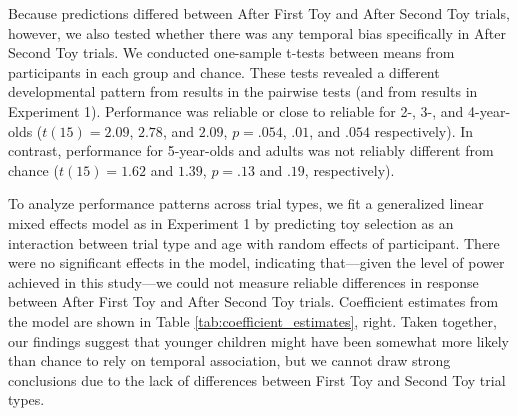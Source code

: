 \documentclass[man]{apa2}
\begin{document}


Because predictions differed between After First Toy and After Second Toy trials, however, we also tested whether there was any temporal bias specifically in After Second Toy trials. We conducted one-sample t-tests between means from participants in each group and chance. These tests revealed a different developmental pattern from results in the pairwise tests (and from results in Experiment 1). Performance was reliable or close to reliable for 2-, 3-, and 4-year-olds ($t(15) = 2.09$, $2.78$, and $2.09$, $p = .054$, $.01$, and $.054$ respectively). In contrast, performance for 5-year-olds and adults was not reliably different from chance ($t(15) = 1.62$ and $1.39$, $p = .13$ and $.19$, respectively). 

To analyze performance patterns across trial types, we fit a generalized linear mixed effects model as in Experiment 1 by predicting toy selection as an interaction between trial type and age with random effects of participant.  There were no significant effects in the model, indicating that---given the level of power achieved in this study---we could not measure reliable differences in response between After First Toy and After Second Toy trials. Coefficient estimates from the model are shown in Table \ref{tab:coefficient_estimates}, right. Taken together, our findings suggest that younger children might have been somewhat more likely than chance to rely on temporal association, but we cannot draw strong conclusions due to the lack of differences between First Toy and Second Toy trial types. 
\end{document}
